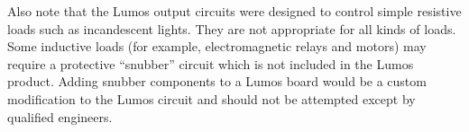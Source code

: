 \documentclass[letterpaper,twoside,onecolumn,openright,final]{memoir}
\begin{document}
Also note that the Lumos output circuits were designed to control simple resistive loads such as
incandescent lights.  They are not appropriate for all kinds of loads.  Some inductive loads
(for example, electromagnetic relays and motors) may require a protective ``snubber'' circuit
which is not included in the Lumos product.  Adding snubber components to a Lumos board would be
a custom modification to the Lumos circuit and should not be attempted except by qualified engineers.

%
\end{document}

